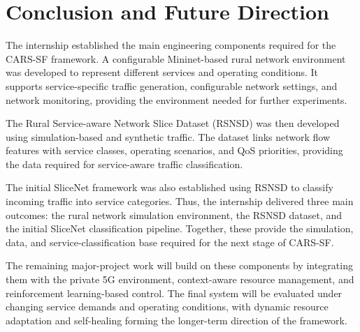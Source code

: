 \documentclass[12pt,a4paper]{report}
\begin{document}
\chapter{Conclusion and Future Direction}
\label{chap:conclusion}

The internship established the main engineering components required for
the CARS-SF framework. A configurable Mininet-based rural network
environment was developed to represent different services and operating
conditions. It supports service-specific traffic generation,
configurable network settings, and network monitoring, providing the
environment needed for further experiments.

The Rural Service-aware Network Slice Dataset (RSNSD) was then developed
using simulation-based and synthetic traffic. The dataset links network
flow features with service classes, operating scenarios, and QoS
priorities, providing the data required for service-aware traffic
classification.

The initial SliceNet framework was also established using RSNSD to
classify incoming traffic into service categories. Thus, the internship
delivered three main outcomes: the rural network simulation environment,
the RSNSD dataset, and the initial SliceNet classification pipeline.
Together, these provide the simulation, data, and service-classification
base required for the next stage of CARS-SF.

The remaining major-project work will build on these components by
integrating them with the private 5G environment, context-aware resource
management, and reinforcement learning-based control. The final system
will be evaluated under changing service demands and operating
conditions, with dynamic resource adaptation and self-healing forming
the longer-term direction of the framework.
	
	
\end{document}
